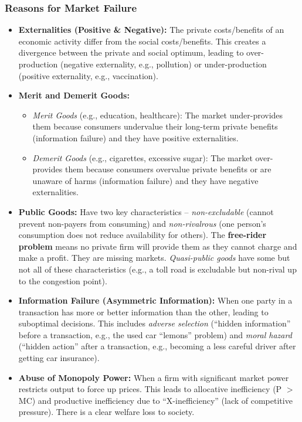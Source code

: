 \documentclass[11pt, a4paper, twoside]{book}
\begin{document}
\subsubsection{Reasons for Market Failure}

\begin{itemize}
  \item \textbf{Externalities (Positive \& Negative):} The private costs/benefits of an economic activity differ from the social costs/benefits. This creates a divergence between the private and social optimum, leading to over-production (negative externality, e.g., pollution) or under-production (positive externality, e.g., vaccination).
  \item \textbf{Merit and Demerit Goods:}
  \begin{itemize}
    \item \emph{Merit Goods} (e.g., education, healthcare): The market under-provides them because consumers undervalue their long-term private benefits (information failure) and they have positive externalities.
    \item \emph{Demerit Goods} (e.g., cigarettes, excessive sugar): The market over-provides them because consumers overvalue private benefits or are unaware of harms (information failure) and they have negative externalities.
  \end{itemize}
  \item \textbf{Public Goods:} Have two key characteristics -- \emph{non-excludable} (cannot prevent non-payers from consuming) and \emph{non-rivalrous} (one person's consumption does not reduce availability for others). The \textbf{free-rider problem} means no private firm will provide them as they cannot charge and make a profit. They are missing markets. \emph{Quasi-public goods} have some but not all of these characteristics (e.g., a toll road is excludable but non-rival up to the congestion point).
  \item \textbf{Information Failure (Asymmetric Information):} When one party in a transaction has more or better information than the other, leading to suboptimal decisions. This includes \emph{adverse selection} (``hidden information'' before a transaction, e.g., the used car ``lemons'' problem) and \emph{moral hazard} (``hidden action'' after a transaction, e.g., becoming a less careful driver after getting car insurance).
  \item \textbf{Abuse of Monopoly Power:} When a firm with significant market power restricts output to force up prices. This leads to allocative inefficiency (P $>$ MC) and productive inefficiency due to ``X-inefficiency'' (lack of competitive pressure). There is a clear welfare loss to society.
\end{itemize}
\end{document}
